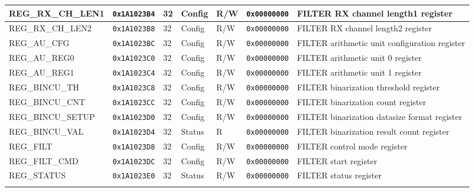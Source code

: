 {\begin{tabularx}{\textwidth}{|l|l|l|l|l|l|X|}
  \hline
  REG\_RX\_CH\_LEN1 & \texttt{0x1A1023B4} & 32 & Config & R/W & \texttt{0x00000000} & FILTER RX channel length1 register\\
  \hline
  REG\_RX\_CH\_LEN2 & \texttt{0x1A1023B8} & 32 & Config & R/W & \texttt{0x00000000} & FILTER RX channel length2 register\\
  \hline
  REG\_AU\_CFG & \texttt{0x1A1023BC} & 32 & Config & R/W & \texttt{0x00000000} & FILTER arithmetic unit configuration register\\
  \hline
  REG\_AU\_REG0 & \texttt{0x1A1023C0} & 32 & Config & R/W & \texttt{0x00000000} & FILTER arithmetic unit 0 register\\
  \hline
  REG\_AU\_REG1 & \texttt{0x1A1023C4} & 32 & Config & R/W & \texttt{0x00000000} & FILTER arithmetic unit 1 register\\
  \hline
  REG\_BINCU\_TH & \texttt{0x1A1023C8} & 32 & Config & R/W & \texttt{0x00000000} & FILTER binarization threshold register\\
  \hline
  REG\_BINCU\_CNT & \texttt{0x1A1023CC} & 32 & Config & R/W & \texttt{0x00000000} & FILTER binarization count register\\
  \hline
  REG\_BINCU\_SETUP & \texttt{0x1A1023D0} & 32 & Config & R/W & \texttt{0x00000000} & FILTER binarization datasize format register\\
  \hline
  REG\_BINCU\_VAL & \texttt{0x1A1023D4} & 32 & Status & R & \texttt{0x00000000} & FILTER binarization result count register\\
  \hline
  REG\_FILT & \texttt{0x1A1023D8} & 32 & Config & R/W & \texttt{0x00000000} & FILTER control mode register\\
  \hline
  REG\_FILT\_CMD & \texttt{0x1A1023DC} & 32 & Config & R/W & \texttt{0x00000000} & FILTER start register\\
  \hline
  REG\_STATUS & \texttt{0x1A1023E0} & 32 & Status & R/W & \texttt{0x00000000} & FILTER status register\\
  \hline
  \caption{uDMA Filter}
\end{tabularx}
}


